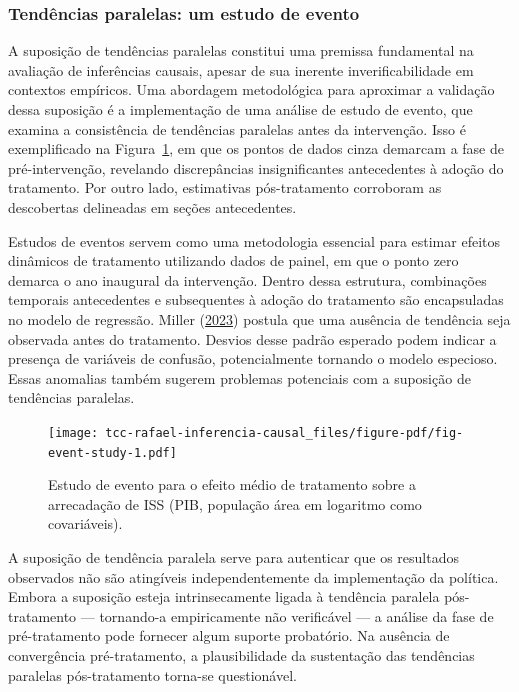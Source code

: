 \documentclass[12pt, a4paper, twoside]{article}
\numberwithin{equation}{subsection} %
\begin{document}
\hypertarget{sec-event-study}{%
\subsubsection{Tendências paralelas: um estudo de
evento}\label{sec-event-study}}

A suposição de tendências paralelas constitui uma premissa fundamental
na avaliação de inferências causais, apesar de sua inerente
inverificabilidade em contextos empíricos. Uma abordagem metodológica
para aproximar a validação dessa suposição é a implementação de uma
análise de estudo de evento, que examina a consistência de tendências
paralelas antes da intervenção. Isso é exemplificado na
Figura~\ref{fig-event-study}, em que os pontos de dados cinza demarcam a
fase de pré-intervenção, revelando discrepâncias insignificantes
antecedentes à adoção do tratamento. Por outro lado, estimativas
pós-tratamento corroboram as descobertas delineadas em seções
antecedentes.

Estudos de eventos servem como uma metodologia essencial para estimar
efeitos dinâmicos de tratamento utilizando dados de painel, em que o
ponto zero demarca o ano inaugural da intervenção. Dentro dessa
estrutura, combinações temporais antecedentes e subsequentes à adoção do
tratamento são encapsuladas no modelo de regressão. Miller
(\protect\hyperlink{ref-Miller-2023}{2023}) postula que uma ausência de
tendência seja observada antes do tratamento. Desvios desse padrão
esperado podem indicar a presença de variáveis
\hspace{0pt}\hspace{0pt}de confusão, potencialmente tornando o modelo
especioso. Essas anomalias também sugerem problemas potenciais com a
suposição de tendências paralelas.

\begin{figure}[H]

{\centering \texttt{[image: tcc-rafael-inferencia-causal\_files/figure-pdf/fig-event-study-1.pdf]}

}

\caption{\label{fig-event-study}Estudo de evento para o efeito médio de
tratamento sobre a arrecadação de ISS (PIB, população área em logaritmo
como covariáveis).}

\end{figure}

A suposição de tendência paralela serve para autenticar que os
resultados observados não são atingíveis independentemente da
implementação da política. Embora a suposição esteja intrinsecamente
ligada à tendência paralela pós-tratamento --- tornando-a empiricamente
não verificável --- a análise da fase de pré-tratamento pode fornecer
algum suporte probatório. Na ausência de convergência pré-tratamento, a
plausibilidade da sustentação das tendências paralelas pós-tratamento
torna-se questionável.
\end{document}
